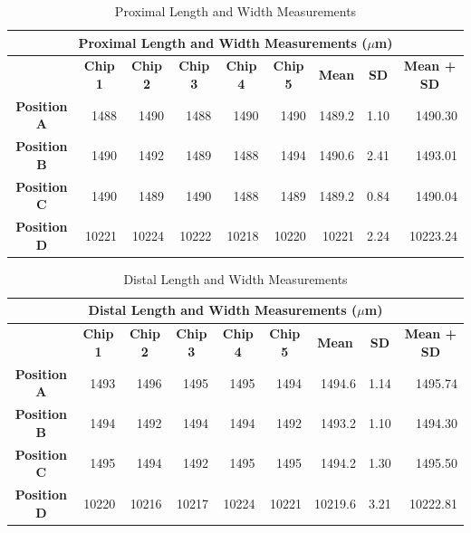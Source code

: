 \documentclass[12pt]{article}
\numberwithin{equation}{section}
\numberwithin{table}{section}
\numberwithin{figure}{section}
\begin{document}

\begin{table}[]
\centering
\caption{Proximal Length and Width Measurements }
\label{PLW}
\begin{tabular}{@{}crrrrrrrr@{}}
\toprule
\multicolumn{9}{c}{\textbf{Proximal Length and Width Measurements ($\mu$m)}}                                                                                                                                                                                                                                                                                   \\ \midrule
\multicolumn{1}{l}{} & \multicolumn{1}{c}{\textbf{Chip 1}} & \multicolumn{1}{c}{\textbf{Chip 2}} & \multicolumn{1}{c}{\textbf{Chip 3}} & \multicolumn{1}{c}{\textbf{Chip 4}} & \multicolumn{1}{c}{\textbf{Chip 5}} & \multicolumn{1}{c}{\textbf{Mean}} & \multicolumn{1}{c}{\textbf{SD}} & \multicolumn{1}{c}{\textbf{Mean + SD}} \\
\textbf{Position A}  & 1488  & 1490  & 1488  & 1490  & 1490 & 1489.2  & 1.10 & 1490.30 \\
\textbf{Position B}  & 1490  & 1492  & 1489  & 1488  & 1494 & 1490.6  & 2.41 & 1493.01 \\
\textbf{Position C}  & 1490  & 1489  & 1490  & 1488  & 1489 & 1489.2  & 0.84 & 1490.04 \\
\textbf{Position D}  & 10221 & 10224 & 10222 & 10218 & 10220 & 10221 & 2.24 & 10223.24 \\ \bottomrule
\end{tabular}
\end{table}

\begin{table}[]
\centering
\caption{Distal Length and Width Measurements }
\label{DLW}
\begin{tabular}{@{}crrrrrrrr@{}}
\toprule
\multicolumn{9}{c}{\textbf{Distal Length and Width Measurements ($\mu$m)}}                                                                                                                                                                                                                                                                                   \\ \midrule
\multicolumn{1}{l}{} & \multicolumn{1}{c}{\textbf{Chip 1}} & \multicolumn{1}{c}{\textbf{Chip 2}} & \multicolumn{1}{c}{\textbf{Chip 3}} & \multicolumn{1}{c}{\textbf{Chip 4}} & \multicolumn{1}{c}{\textbf{Chip 5}} & \multicolumn{1}{c}{\textbf{Mean}} & \multicolumn{1}{c}{\textbf{SD}} & \multicolumn{1}{c}{\textbf{Mean + SD}} \\
\textbf{Position A}  & 1493  & 1496  & 1495  & 1495  & 1494  & 1494.6  & 1.14 & 1495.74  \\
\textbf{Position B}  & 1494  & 1492  & 1494  & 1494  & 1492  & 1493.2  & 1.10 & 1494.30  \\
\textbf{Position C}  & 1495  & 1494  & 1492  & 1495  & 1495  & 1494.2  & 1.30 & 1495.50  \\ 
\textbf{Position D}  & 10220 & 10216 & 10217 & 10224 & 10221 & 10219.6 & 3.21 & 10222.81 \\ \bottomrule
\end{tabular}
\end{table}
\end{document}
